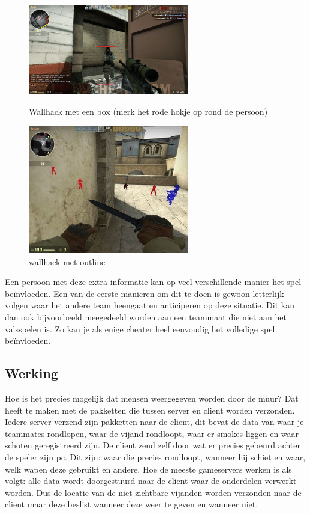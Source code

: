 \documentclass[pdftex,a4paper,12pt,twoside]{report}
\begin{document}
\begin{figure}[H]
\centering
\begin{minipage}{0.48\textwidth}
\centering
\includegraphics[width=7cm]{img/wallhack-example-box}
\caption{Wallhack met een box (merk het rode hokje op rond de persoon)}
\end{minipage}\hfill
\begin{minipage}{0.48\textwidth}
\centering
\includegraphics[width=7cm]{img/wallhack-example-outline}
\caption{wallhack met outline}
\end{minipage}
\end{figure}  

Een persoon met deze extra informatie kan op veel verschillende manier het spel beïnvloeden. Een van de eerste manieren om dit te doen is gewoon letterlijk volgen waar het andere team heengaat en anticiperen op deze situatie. Dit kan dan ook bijvoorbeeld meegedeeld worden aan een teammaat die niet aan het valsspelen is. Zo kan je als enige cheater heel eenvoudig het volledige spel beïnvloeden.


\subsection{Werking}
\label{subsec:werking}
Hoe is het precies mogelijk dat mensen weergegeven worden door de muur? Dat heeft te maken met de pakketten die tussen server en client worden verzonden. Iedere server verzend zijn pakketten naar de client, dit bevat de data van waar je teammates rondlopen, waar de vijand rondloopt, waar er smokes liggen en waar schoten geregistreerd zijn. De client zend zelf door wat er precies gebeurd achter de speler zijn pc. Dit zijn: waar die precies rondloopt, wanneer hij schiet en waar, welk wapen deze gebruikt en andere. Hoe de meeste gameservers werken is als volgt: alle data wordt doorgestuurd naar de client waar de onderdelen verwerkt worden. Dus de locatie van de niet zichtbare vijanden worden verzonden naar de client maar deze beslist wanneer deze weer te geven en wanneer niet.
\\
\end{document}
